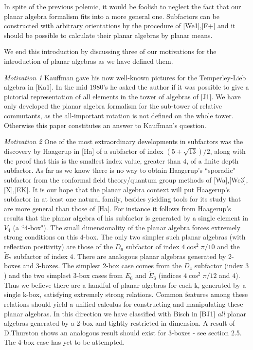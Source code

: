 In spite of the previous polemic, it would be foolish to 
neglect the fact that our planar algebra formalism fits
into a more general one. Subfactors can be constructed
with arbitrary orientations by the procedure of [We1],[F+]
and it should be possible to calculate their planar algebras
by planar means.

We end this introduction by discussing three of our motivations
for the introduction of planar algebras as we have defined them.

{\it Motivation 1 }  Kauffman gave his now well-known pictures
for the Temperley-Lieb algebra in [Ka1]. In the mid 1980's he 
asked the author if it was possible to give a pictorial
representation of all elements in the tower of algebras of [J1].
We have only developed the planar algebra formalism for the
sub-tower of relative commutants, as the all-important rotation is
not defined on the whole tower. Otherwise this paper constitutes
an answer to Kauffman's question.

{\it Motivation 2 } One of the most extraordinary developments in 
subfactors was the discovery by Haagerup in [Ha] of a subfactor
of index $(5 + \sqrt{13})/2$, along with the proof that this is 
the smallest index value, greater than $4$, of a finite depth
subfactor. As far as we know there is no way to obtain Haagerup's
``sporadic" subfactor from the conformal field theory/quantum group
methods of [Wa],[We3],[X],[EK]. It is our hope that the planar algebra
context will put Haagerup's subfactor in at least one natural
family, besides yielding tools for its study that are more
general than those of [Ha]. For instance it follows from 
Haagerup's results that the planar algebra of his subfactor is
generated by a single element in $V_4$ (a ``4-box"). The small
dimensionality of the planar algebra forces extremely strong 
conditions on this 4-box. The only two simpler such planar algebras
(with reflection positivity) are those of the $D_6$ subfactor
of index $4\cos^2\pi/10$ and the $\tilde E_7$ subfactor of
index $4$. There are analogous planar algebras generated by
2-boxes and 3-boxes. The simplest 2-box case comes from the
$D_4$ subfactor (index $3$) and the two simplest 3-box cases from
$E_6$ and $\tilde E_6$ (indices $4\cos^2\pi/12$ and $4$).
Thus we believe there are a handful of planar algebras for
each k, generated by a single k-box, satisfying extremely 
strong relations. Common features among these relations
should yield a unified calculus for constructing and manipulating
these planar algebras. In this direction we have classified 
with Bisch in [BJ1] {\it all} planar algebras generated by
a 2-box and tightly restricted in dimension. A result of
D.Thurston shows an analogous result should exist for 3-boxes - see section 2.5.
The 4-box case has yet to be attempted.

